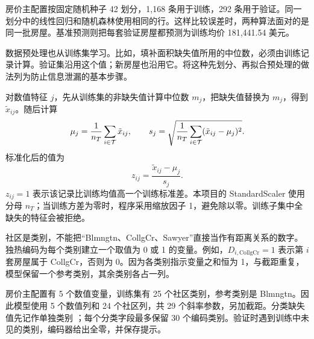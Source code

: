 房价主配置按固定随机种子 42 划分，1,168 条用于训练，292 条用于验证。同一划分中的线性回归和随机森林使用相同的行。这样比较误差时，两种算法面对的是同一批房屋。基准预测则把每套验证房屋都预测为训练均价 181,441.54 美元。

数据预处理也从训练集学习。比如，填补面积缺失值所用的中位数，必须由训练记录计算。验证集沿用这个值；新房屋也沿用它。\citet{sklearnpitfalls}将这种先划分、再拟合预处理的做法列为防止信息泄漏的基本步骤。

对数值特征 $j$，先从训练集的非缺失值计算中位数 $m_j$，把缺失值替换为 $m_j$，得到 $\tilde x_{ij}$。随后计算
\begin{equation}
\mu_j=\frac1{n_T}\sum_{i\in\mathcal{T}}\tilde x_{ij},\qquad
s_j=\sqrt{\frac1{n_T}\sum_{i\in\mathcal{T}}(\tilde x_{ij}-\mu_j)^2}.
\end{equation}
标准化后的值为
\begin{equation}\label{app:eq:scale}
z_{ij}=\frac{\tilde x_{ij}-\mu_j}{s_j}.
\end{equation}
$z_{ij}=1$ 表示该记录比训练均值高一个训练标准差。本项目的 StandardScaler 使用分母 $n_T$；当训练方差为零时，程序采用缩放因子 1，避免除以零。训练子集中全缺失的特征会被拒绝。

社区是类别，不能把“Blmngtn、CollgCr、Sawyer”直接当作有距离关系的数字。独热编码为每个类别建立一个取值为 0 或 1 的变量。例如，$D_{i,\text{CollgCr}}=1$ 表示第 $i$ 套房屋属于 CollgCr，否则为 0。因为各类别指示变量之和恒为 1，与截距重复，模型保留一个参考类别，其余类别各占一列。

房价主配置有 5 个数值变量，训练集有 25 个社区类别，参考类别是 Blmngtn。因此模型使用 5 个数值列和 24 个社区列，共 29 个斜率参数，另加截距。分类缺失值先记作单独类别 ；每个分类字段最多保留 30 个编码类别。验证时遇到训练中未见的类别，编码器给出全零，并保存提示。

